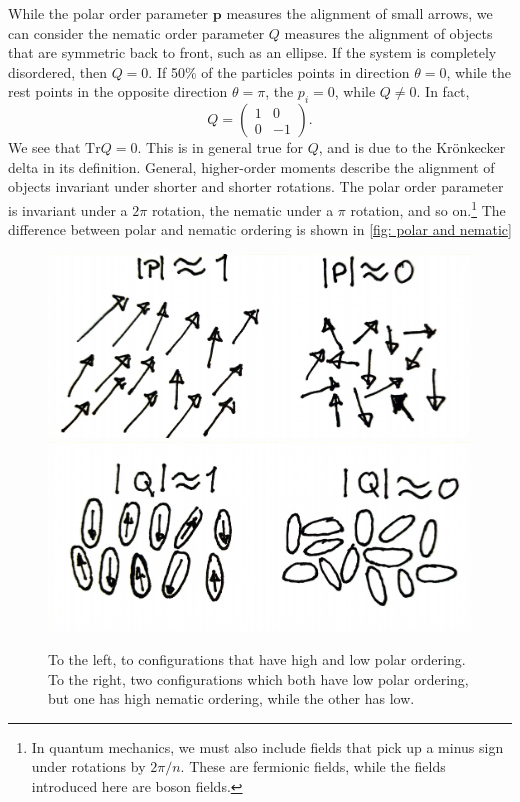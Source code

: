 While the polar order parameter $\bm p$ measures the alignment of small arrows, we can consider the nematic order parameter $Q$ measures the alignment of objects that are symmetric back to front, such as an ellipse.
If the system is completely disordered, then $Q = 0$.
If 50\% of the particles points in direction $\theta = 0$, while the rest points in the opposite direction $\theta = \pi$, the $p_i = 0$, while $Q\neq 0$.
In fact, 
%
\begin{equation}
    Q = 
    \begin{pmatrix}
        1 & 0 \\ 0 & -1
    \end{pmatrix}.
\end{equation}
%
We see that $\mathrm{Tr} Q = 0$.
This is in general true for $Q$, and is due to the Krönkecker delta in its definition.
General, higher-order moments describe the alignment of objects invariant under shorter and shorter rotations.
The polar order parameter is invariant under a $2 \pi$ rotation, the nematic under a $\pi$ rotation, and so on.\footnote{
    In quantum mechanics, we must also include fields that pick up a minus sign under rotations by $2 \pi / n$.
    These are fermionic fields, while the fields introduced here are boson fields.
}
The difference between polar and nematic ordering is shown in \autoref{fig: polar and nematic}

\begin{figure}[!htb]
    \centering
    \includegraphics[width=.38\textwidth]{chapters/Figures/scalar/polar.pdf}
    \hspace{1cm}
    \includegraphics[width=.4\textwidth]{chapters/Figures/scalar/nematic.pdf}
    \caption{
        To the left, to configurations that have high and low polar ordering.
    To the right, two configurations which both have low polar ordering, but one has high nematic ordering, while the other has low.}
    \label{fig: polar and nematic}
\end{figure}

